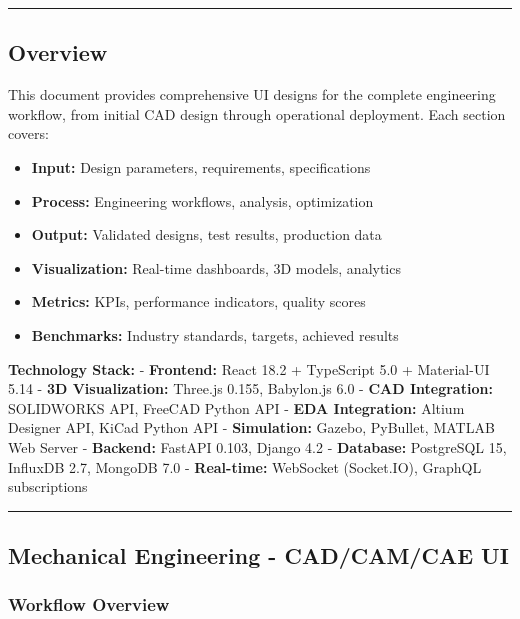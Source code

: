 \documentclass[
]{article}
\providecommand{\tightlist}{%
  \setlength{\itemsep}{0pt}\setlength{\parskip}{0pt}}
\begin{document}
\begin{center}\rule{0.5\linewidth}{0.5pt}\end{center}

\hypertarget{overview}{%
\subsection{Overview}\label{overview}}

This document provides comprehensive UI designs for the complete
engineering workflow, from initial CAD design through operational
deployment. Each section covers:

\begin{itemize}
\tightlist
\item
  \textbf{Input:} Design parameters, requirements, specifications
\item
  \textbf{Process:} Engineering workflows, analysis, optimization
\item
  \textbf{Output:} Validated designs, test results, production data
\item
  \textbf{Visualization:} Real-time dashboards, 3D models, analytics
\item
  \textbf{Metrics:} KPIs, performance indicators, quality scores
\item
  \textbf{Benchmarks:} Industry standards, targets, achieved results
\end{itemize}

\textbf{Technology Stack:} - \textbf{Frontend:} React 18.2 + TypeScript
5.0 + Material-UI 5.14 - \textbf{3D Visualization:} Three.js 0.155,
Babylon.js 6.0 - \textbf{CAD Integration:} SOLIDWORKS API, FreeCAD
Python API - \textbf{EDA Integration:} Altium Designer API, KiCad Python
API - \textbf{Simulation:} Gazebo, PyBullet, MATLAB Web Server -
\textbf{Backend:} FastAPI 0.103, Django 4.2 - \textbf{Database:}
PostgreSQL 15, InfluxDB 2.7, MongoDB 7.0 - \textbf{Real-time:} WebSocket
(Socket.IO), GraphQL subscriptions

\begin{center}\rule{0.5\linewidth}{0.5pt}\end{center}

\hypertarget{mechanical-engineering---cadcamcae-ui}{%
\subsection{Mechanical Engineering - CAD/CAM/CAE
UI}\label{mechanical-engineering---cadcamcae-ui}}

\hypertarget{workflow-overview}{%
\subsubsection{Workflow Overview}\label{workflow-overview}}
\end{document}
